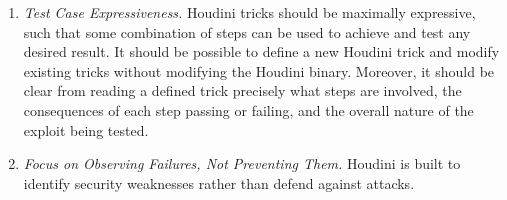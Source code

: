 \documentclass[12pt]{report}
\begin{document}
\begin{doublespace}
\begin{enumerate}
  \item \label{dg:test}\textit{Test Case Expressiveness.} Houdini tricks should be maximally expressive, such that some combination of steps can be used to achieve and test any desired result. It should be possible to define a new Houdini trick and modify existing tricks without modifying the Houdini binary. Moreover, it should be clear from reading a defined trick precisely what steps are involved, the consequences of each step passing or failing, and the overall nature of the exploit being tested.

  \item \label{dg:failures}\textit{Focus on Observing Failures, Not Preventing Them.} Houdini is built to identify security weaknesses rather than defend against attacks.
\end{enumerate}

\end{doublespace} 	\fontsize{12pt}{14pt} \selectfont
\end{document}
